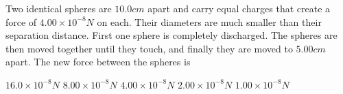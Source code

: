 \begin{questions}\setcounter{question}{29}\question
Two identical spheres are $10.0 \unit{cm}$ apart and carry equal charges that create a force of $4.00 \times 10^{-8} \unit{N}$ on each. Their diameters are much smaller than their separation distance.
First one sphere is completely discharged. The spheres are then moved together until they touch, and finally they are moved to $5.00 \unit{cm}$ apart. The new force between the spheres is

\begin{choices}
\choice $16.0 \times 10^{-8} \unit{N}$
\choice $8.00 \times 10^{-8} \unit{N}$
\choice $4.00 \times 10^{-8} \unit{N}$
\choice $2.00 \times 10^{-8} \unit{N}$
\choice $1.00 \times 10^{-8} \unit{N}$
\end{choices}\end{questions}


